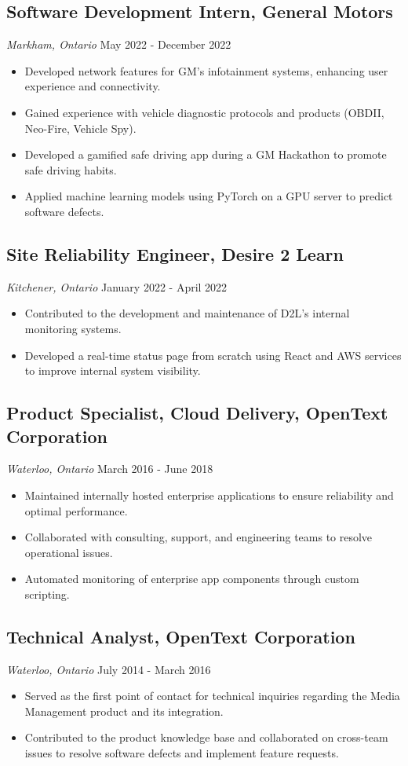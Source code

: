 \documentclass[a4paper,11pt]{article}  %
\begin{document}
\subsection*{Software Development Intern, General Motors}
\textit{Markham, Ontario} \hfill May 2022 - December 2022
\begin{itemize}
    \item Developed network features for GM’s infotainment systems, enhancing user experience and connectivity.
    \item Gained experience with vehicle diagnostic protocols and products (OBDII, Neo-Fire, Vehicle Spy).
    \item Developed a gamified safe driving app during a GM Hackathon to promote safe driving habits.
    \item Applied machine learning models using PyTorch on a GPU server to predict software defects.
\end{itemize}

\subsection*{Site Reliability Engineer, Desire 2 Learn}
\textit{Kitchener, Ontario} \hfill January 2022 - April 2022
\begin{itemize}
    \item Contributed to the development and maintenance of D2L’s internal monitoring systems.
    \item Developed a real-time status page from scratch using React and AWS services to improve internal system visibility.
\end{itemize}

\subsection*{Product Specialist, Cloud Delivery, OpenText Corporation}
\textit{Waterloo, Ontario} \hfill March 2016 - June 2018
\begin{itemize}
    \item Maintained internally hosted enterprise applications to ensure reliability and optimal performance.
    \item Collaborated with consulting, support, and engineering teams to resolve operational issues.
    \item Automated monitoring of enterprise app components through custom scripting.
\end{itemize}

\subsection*{Technical Analyst, OpenText Corporation}
\textit{Waterloo, Ontario} \hfill July 2014 - March 2016
\begin{itemize}
    \item Served as the first point of contact for technical inquiries regarding the Media Management product and its integration.
    \item Contributed to the product knowledge base and collaborated on cross-team issues to resolve software defects and implement feature requests.
\end{itemize}
\end{document}

